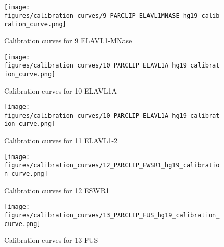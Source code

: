 \documentclass[11pt]{article}
\begin{document}
    
    
    \begin{figure}
        \begin{center}
            \texttt{[image: figures/calibration\_curves/9\_PARCLIP\_ELAVL1MNASE\_hg19\_calibration\_curve.png]}
            \caption{Calibration curves for 9 ELAVL1-MNase}
            \label{fig:calibration9 ELAVL1-MNase}
        \end{center}
    \end{figure}

    
    
    \begin{figure}
        \begin{center}
            \texttt{[image: figures/calibration\_curves/10\_PARCLIP\_ELAVL1A\_hg19\_calibration\_curve.png]}
            \caption{Calibration curves for 10 ELAVL1A}
            \label{fig:calibration10 ELAVL1A}
        \end{center}
    \end{figure}

    
    
    \begin{figure}
        \begin{center}
            \texttt{[image: figures/calibration\_curves/10\_PARCLIP\_ELAVL1A\_hg19\_calibration\_curve.png]}
            \caption{Calibration curves for 11 ELAVL1-2}
            \label{fig:calibration11 ELAVL1-2}
        \end{center}
    \end{figure}

    
    
    \begin{figure}
        \begin{center}
            \texttt{[image: figures/calibration\_curves/12\_PARCLIP\_EWSR1\_hg19\_calibration\_curve.png]}
            \caption{Calibration curves for 12 ESWR1}
            \label{fig:calibration12 ESWR1}
        \end{center}
    \end{figure}

    
    
    \begin{figure}
        \begin{center}
            \texttt{[image: figures/calibration\_curves/13\_PARCLIP\_FUS\_hg19\_calibration\_curve.png]}
            \caption{Calibration curves for 13 FUS}
            \label{fig:calibration13 FUS}
        \end{center}
    \end{figure}
\end{document}

